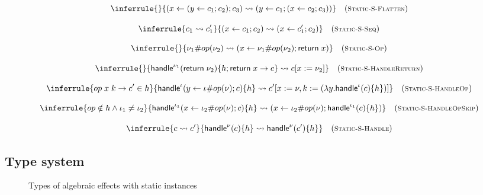 {\begin{figure}
{\begin{minipage}{18 cm}
\[\inferrule{
}{
	(\cdo{x}{(\cdo{y}{\comp_1}{\comp_2})}{\comp_3}) \rightsquigarrow (\cdo{y}{\comp_1}{(\cdo{x}{\comp_2}{\comp_3})})
}\quad(\footnotesize\textsc{Static-S-Flatten})\]

\[\inferrule{
	\comp_1 \rightsquigarrow \comp_1'
}{
	(\cdo{x}{\comp_1}{\comp_2}) \rightsquigarrow (\cdo{x}{\comp_1'}{\comp_2})
}\quad(\footnotesize\textsc{Static-S-Seq})\]

\[\inferrule{
}{
	\copi{\val_1}{op}{\val_2} \rightsquigarrow (\cdo{x}{\copi{\val_1}{op}{\val_2}}{\creturn{x}})
}\quad(\footnotesize\textsc{Static-S-Op})\]

\[\inferrule{
}{
	\chandlei{\val_1}{\creturn{\val_2}}{h; \hreturn{x}{\comp}} \rightsquigarrow \comp[x := \val_2]
}\quad(\footnotesize\textsc{Static-S-HandleReturn})\]

\[\inferrule{
	\hopc{op}{x}{k}{\comp'} \in h
}{
	\chandlei{\vinst}{\cdo{y}{\copi{\vinst}{op}{\val}}{\comp}}{h} \rightsquigarrow \comp'[x := \val, k := (\vabs{y}{\chandlei{\vinst}{\comp}{h}})]
}\quad(\footnotesize\textsc{Static-S-HandleOp})\]

\[\inferrule{
	op \notin h \land \vinst_1 \neq \vinst_2
}{
	\chandlei{\vinst_1}{\cdo{x}{\copi{\vinst_2}{op}{\val}}{\comp}}{h} \rightsquigarrow (\cdo{x}{\copi{\vinst_2}{op}{\val}}{\chandlei{\vinst_1}{\comp}{h}})
}\quad(\footnotesize\textsc{Static-S-HandleOpSkip})\]

\[\inferrule{
	\comp \rightsquigarrow \comp'
}{
	\chandlei{\val}{\comp}{h} \rightsquigarrow \chandlei{\val}{\comp'}{h}
}\quad(\footnotesize\textsc{Static-S-Handle})\]
\label{fig:semantics-static}
\end{minipage}
}
\end{figure}

\subsection{Type system}

\begin{figure}
\caption{Types of algebraic effects with static instances}
\centering
{}
\end{figure}

}
